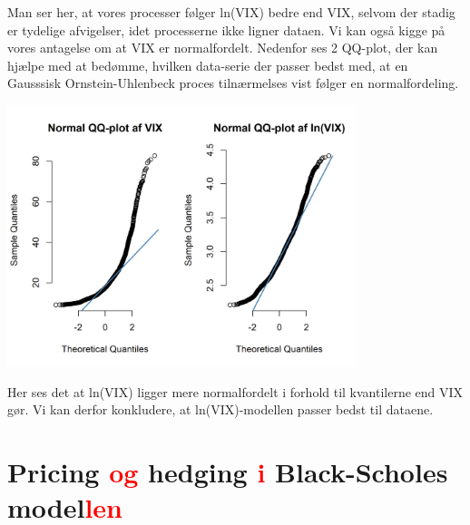 \documentclass{article}
\theoremstyle{definition}
\theoremstyle{remark}
\begin{document}
Man ser her, at vores processer følger ln(VIX) bedre end VIX, selvom der stadig er tydelige afvigelser, idet processerne ikke ligner dataen. Vi kan også kigge på vores antagelse om at VIX er normalfordelt. Nedenfor ses 2 QQ-plot, der kan hjælpe med at bedømme, hvilken data-serie der passer bedst med\color{red}, at en Gausssisk Ornstein-Uhlenbeck proces tilnærmelses vist følger en normalfordeling.\color{black}
\begin{center}
    \includegraphics[width=4in]{QQ_VIX_vs_lnVIX}
\end{center}
Her ses det at ln(VIX) ligger mere normalfordelt i forhold til kvantilerne end VIX gør. Vi kan derfor konkludere, at ln(VIX)-modellen passer bedst til dataene.
\section{Pricing \textcolor{red}{og} hedging \textcolor{red}{i} Black-Scholes model\textcolor{red}{len}}
\end{document}

